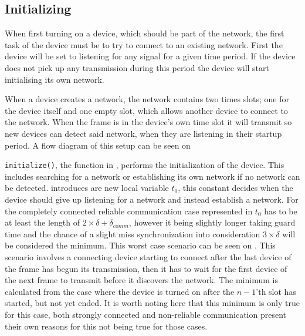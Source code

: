 \subsection{Initializing} %
\label{sub:setupCCRC} 
When first turning on a device, which should be part of the network, the first task of the device must be to try to connect to an existing network.
First the device will be set to listening for any signal for a given time period. 
If the device does not pick up any transmission during this period the device will start initialising its own network.

When a device creates a network, the network contains two times slots; one for the device itself and one empty slot, which allows another device to connect to the network.
When the frame is in the device's own time slot it will transmit so new devices can detect said network, when they are listening in their startup period.  
A flow diagram of this setup can be seen on 

 
\bigskip \noindent
\texttt{initialize()}, the function in , performs the initialization of the device.
This includes searching for a network or establishing its own network if no network can be detected.
 introduces are new local variable $t_0$, this constant decides when the device should give up listening for a network and instead establish a network.
For the completely connected reliable communication case represented in  $t_0$ has to be at least the length of $2 \times \delta + \delta_{comm}$, however it being slightly longer taking guard time and the chance of a slight miss synchronization into consideration $3 \times \delta$ will be considered the minimum. 
This worst case scenario can be seen on .
This scenario involves a connecting device starting to connect after the last device of the frame has begun its transmission, then it has to wait for the first device of the next frame to transmit before it discovers the network. 
The minimum is calculated from the case where the device is turned on after the $n-1$'th slot has started, but not yet ended.
It is worth noting here that this minimum is only true for this case, both strongly connected and non-reliable communication present their own reasons for this not being true for those cases.

